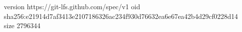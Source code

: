 version https://git-lfs.github.com/spec/v1
oid sha256:e21914d7af3413e2107186326ac234f930d76632ea6e67ea42b4d29cf0228d14
size 2796344
